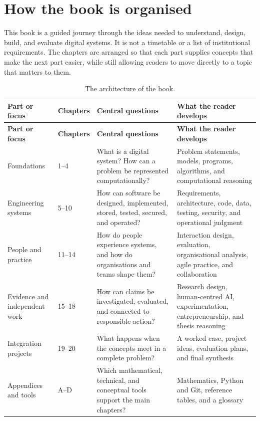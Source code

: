 \chapter*{How the book is organised}

This book is a guided journey through the ideas needed to understand, design, build, and evaluate digital systems. It is not a timetable or a list of institutional requirements. The chapters are arranged so that each part supplies concepts that make the next part easier, while still allowing readers to move directly to a topic that matters to them.

\begingroup
\setlength{\tabcolsep}{4pt}
\begin{longtable}{p{}p{}p{}p{}}
\caption{The architecture of the book.}\label{tab:book-map}\\
\toprule
\textbf{Part or focus} & \textbf{Chapters} & \textbf{Central questions} & \textbf{What the reader develops}\\
\midrule
\endfirsthead
\toprule
\textbf{Part or focus} & \textbf{Chapters} & \textbf{Central questions} & \textbf{What the reader develops}\\
\midrule
\endhead
Foundations & 1--4 & What is a digital system? How can a problem be represented computationally? & Problem statements, models, programs, algorithms, and computational reasoning\\
Engineering systems & 5--10 & How can software be designed, implemented, stored, tested, secured, and operated? & Requirements, architecture, code, data, testing, security, and operational judgment\\
People and practice & 11--14 & How do people experience systems, and how do organisations and teams shape them? & Interaction design, evaluation, organisational analysis, agile practice, and collaboration\\
Evidence and independent work & 15--18 & How can claims be investigated, evaluated, and connected to responsible action? & Research design, human-centred AI, experimentation, entrepreneurship, and thesis reasoning\\
Integration projects & 19--20 & What happens when the concepts meet in a complete problem? & A worked case, project ideas, evaluation plans, and final synthesis\\
Appendices and tools & A--D & Which mathematical, technical, and conceptual tools support the main chapters? & Mathematics, Python and Git, reference tables, and a glossary\\
\bottomrule
\end{longtable}
\endgroup


